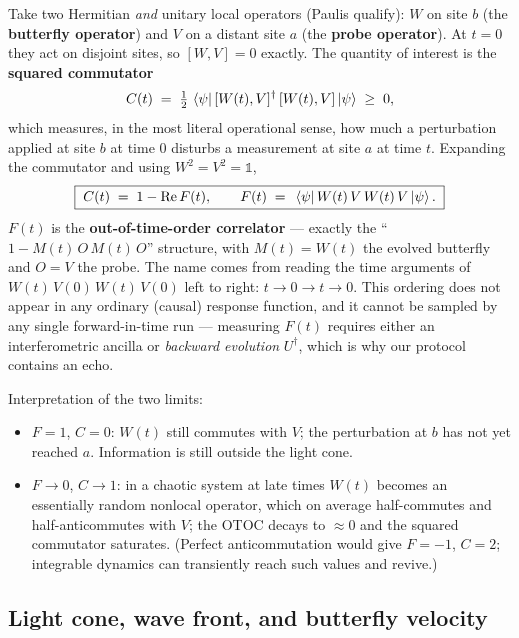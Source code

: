 \documentclass[11pt]{article}
\begin{document}
Take two Hermitian \emph{and} unitary local operators (Paulis qualify):
$W$ on site $b$ (the \textbf{butterfly operator}) and $V$ on a distant site
$a$ (the \textbf{probe operator}). At $t=0$ they act on disjoint sites, so
$[W,V]=0$ exactly. The quantity of interest is the \textbf{squared
commutator}
\begin{equation}
  C(t) \;=\; \tfrac{1}{2}\,
  \expval{\,[W(t),V]^\dagger\,[W(t),V]\,}{\psi} \;\geq\; 0 ,
  \label{eq:sqcomm}
\end{equation}
which measures, in the most literal operational sense, how much a
perturbation applied at site $b$ at time $0$ disturbs a measurement at site
$a$ at time $t$. Expanding the commutator and using $W^2=V^2=\mathbb{1}$,
\begin{equation}
  \boxed{\;
  C(t) \;=\; 1 - \mathrm{Re}\, F(t),
  \qquad
  F(t) \;=\; \expval{\,W(t)\,V\,W(t)\,V\,}{\psi} .
  \;}
  \label{eq:otocdef}
\end{equation}
$F(t)$ is the \textbf{out-of-time-order correlator} --- exactly the
``$1 - M(t)\,O\,M(t)\,O$'' structure, with $M(t)=W(t)$ the evolved butterfly
and $O=V$ the probe. The name comes from reading the time arguments of
$W(t)\,V(0)\,W(t)\,V(0)$ left to right: $t \to 0 \to t \to 0$. This ordering
does not appear in any ordinary (causal) response function, and it cannot be
sampled by any single forward-in-time run --- measuring $F(t)$ requires
either an interferometric ancilla or \emph{backward evolution} $U^\dagger$,
which is why our protocol contains an echo.

Interpretation of the two limits:
\begin{itemize}
  \item $F=1$, $C=0$: $W(t)$ still commutes with $V$; the perturbation at
  $b$ has not yet reached $a$. Information is still outside the light cone.
  \item $F\to 0$, $C\to 1$: in a chaotic system at late times $W(t)$ becomes
  an essentially random nonlocal operator, which on average half-commutes and
  half-anticommutes with $V$; the OTOC decays to $\approx 0$ and the squared
  commutator saturates. (Perfect anticommutation would give $F=-1$, $C=2$;
  integrable dynamics can transiently reach such values and revive.)
\end{itemize}

\subsection{Light cone, wave front, and butterfly velocity}
\label{sec:frontdef}
\end{document}
